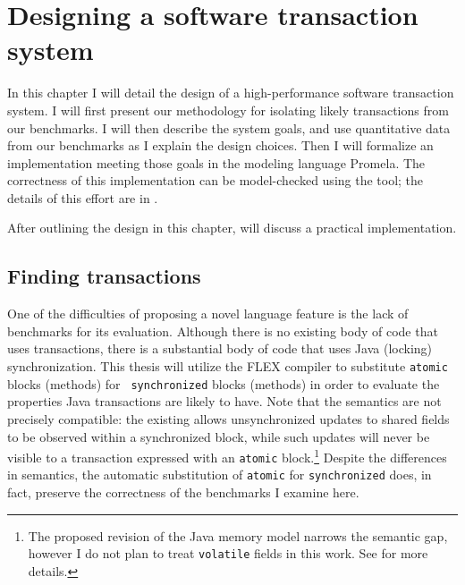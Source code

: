 \chapter{Designing a software transaction system}\label{cha:stm}

In this chapter I will detail the design of a
high-performance software transaction system.  I will first present
our methodology for isolating likely transactions from our benchmarks.
I will then describe the system goals, and use quantitative data from
our benchmarks as I explain the design choices.  Then I will formalize an
implementation meeting those goals in the modeling language
Promela.  The correctness of this implementation can be model-checked
using the \Spin tool; the details of this effort are in
.

After outlining the design in this chapter,  will
discuss a practical implementation.

\section{Finding transactions}\label{sec:auto}
One of the difficulties of proposing a novel language feature is the
lack of benchmarks for its evaluation.  Although there is no existing body of
code that uses transactions, there is a substantial body of
code that uses Java (locking) synchronization.  This thesis will
utilize the FLEX compiler \cite{Flex} to
substitute {\tt atomic} blocks (methods) for {\tt
  synchronized} blocks (methods) in order to evaluate the properties
Java transactions are likely to have.  Note that the semantics are not
precisely compatible: the existing  allows
unsynchronized updates to shared fields to be observed within a
synchronized block, while such updates will never be visible to a
transaction expressed with an
{\tt atomic} block.\footnote{The proposed revision of the Java memory model
\cite{MansonPu02} narrows the semantic gap, however I do not
plan to treat {\tt volatile} fields in this work.  See
 for more details.}
Despite the differences in semantics, the automatic substitution of
{\tt atomic} for {\tt synchronized} does, in fact, preserve the
correctness of the benchmarks I examine here.

